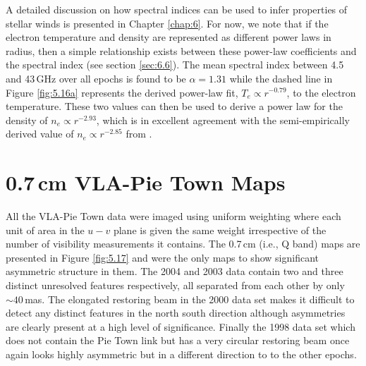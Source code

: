 A detailed discussion on how spectral indices can be used to infer properties of stellar winds is presented in Chapter \ref{chap:6}. For now, we note that if the electron temperature and density are represented as different power laws in radius, then a simple relationship  exists between these power-law coefficients and the spectral index (see section \ref{sec:6.6}). The mean spectral index between 4.5 and 43\,GHz over all epochs is found to be $\alpha =1.31$ while the dashed line in Figure \ref{fig:5.16a} represents the derived power-law fit, $T_{e} \propto r^{-0.79}$, to the electron temperature. These two values can then be used to derive a power law for the density of $n_{e} \propto r^{-2.93}$, which is in excellent agreement with the semi-empirically derived value of $n_{e} \propto r^{-2.85}$ from \cite{harper_2001}.

\section{0.7\,cm VLA-Pie Town Maps}\label{sec:5.15}

All the VLA-Pie Town data were imaged using uniform weighting where each unit of area in the $u-v$ plane is given the same weight irrespective of the number of visibility measurements it contains. The 0.7\,cm (i.e., Q band) maps are presented in Figure \ref{fig:5.17} and were the only maps to show significant asymmetric structure in them. The 2004 and 2003 data contain two and three distinct unresolved features respectively, all separated from each other by only $\sim 40$\,mas. The elongated restoring beam in the 2000 data set makes it difficult to detect any distinct features in the north south direction although asymmetries are clearly present at a high level of significance. Finally the 1998 data set which does not contain the Pie Town link but has a very circular restoring beam once again looks highly asymmetric but in a different direction to to the other epochs.

